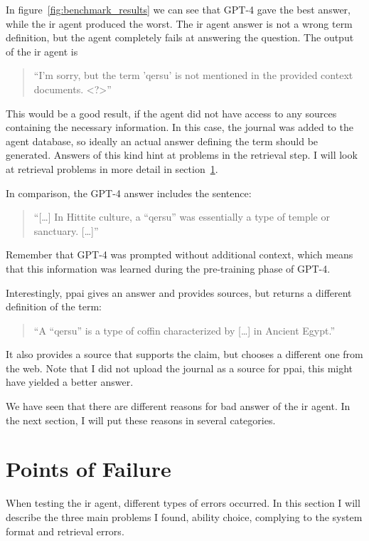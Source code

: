 \documentclass[../main.tex]{subfiles}
\begin{document}
In figure~\ref{fig:benchmark_results} we can see that GPT-4 gave the best answer,
while the \gls{ir} agent produced the worst.
The \gls{ir} agent answer is not a wrong term definition,
but the agent completely fails at answering the question.
The output of the \gls{ir} agent is
\begin{quote}
      ``I'm sorry, but the term 'qersu' is not mentioned in the provided context documents. <?>''
\end{quote}
This would be a good result, if the agent did not have access to any sources
containing the necessary information.
In this case, the journal was added to the agent database, so ideally an actual
answer defining the term should be generated.
Answers of this kind hint at problems in the retrieval step.
I will look at retrieval problems in more detail in section~\ref{sec:pof}.

In comparison, the GPT-4 answer includes the sentence:
\begin{quote}
      ``[\dots] In Hittite culture, \textcolor{emph blue}{a ``qersu'' was}
      essentially \textcolor{emph blue}{a type of temple or sanctuary}. [\dots]''
\end{quote}
Remember that GPT-4 was prompted without additional context,
which means that this information was learned during the pre-training phase of GPT-4.

Interestingly, \gls{ppai} gives an answer and provides sources,
but returns a different definition of the term:
\begin{quote}
      ``A ``qersu'' is a type of coffin characterized by [\dots] in Ancient Egypt.''
\end{quote}
It also provides a source that supports the claim, but chooses a different one
from the web.
Note that I did not upload the journal as a source for \gls{ppai}, this might
have yielded a better answer.

We have seen that there are different reasons for bad answer of the \gls{ir} agent.
In the next section, I will put these reasons in several categories.

\section{Points of Failure}
\label{sec:pof}

When testing the \gls{ir} agent, different types of errors occurred.
In this section I will describe the three main problems I found, ability choice, complying
to the system format and retrieval errors.
\end{document}
